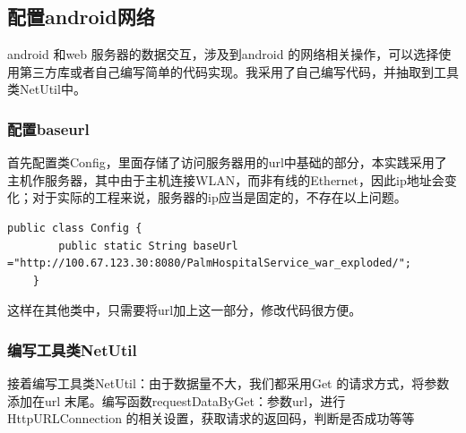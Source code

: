 \documentclass[UTF8,12pt]{article}
\begin{document}
\newpage

\subsection{配置android网络}
android 和web 服务器的数据交互，涉及到android 的网络相关操作，可以选择使用第三方库或者自己编写简单的代码实现。我采用了自己编写代码，并抽取到工具类NetUtil中。

\subsubsection{配置baseurl}
首先配置类Config，里面存储了访问服务器用的url中基础的部分，本实践采用了主机作服务器，其中由于主机连接WLAN，而非有线的Ethernet，因此ip地址会变化；对于实际的工程来说，服务器的ip应当是固定的，不存在以上问题。

\begin{lstlisting}[frame=shadowbox]
    public class Config {
        public static String baseUrl ="http://100.67.123.30:8080/PalmHospitalService_war_exploded/";
    }
\end{lstlisting}

这样在其他类中，只需要将url加上这一部分，修改代码很方便。

\subsubsection{编写工具类NetUtil}
接着编写工具类NetUtil：由于数据量不大，我们都采用Get 的请求方式，将参数添加在url 末尾。编写函数requestDataByGet：参数url，进行HttpURLConnection 的相关设置，获取请求的返回码，判断是否成功等等
\end{document}
